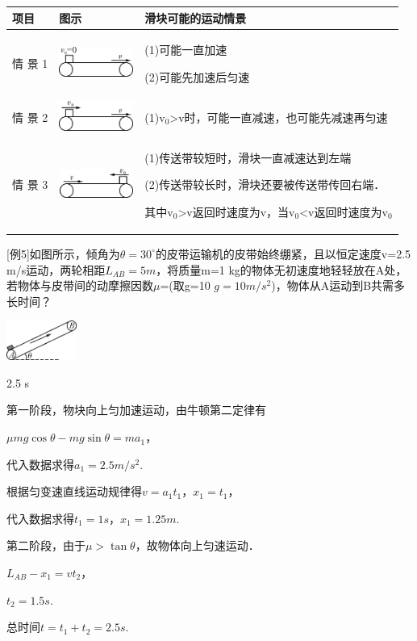 \documentclass[cn,10.5pt,chinese,mac,chinesefont=founder]{elegantbook}
\begin{document}
\begin{longtable}[]{@{}m{1cm}m{2.5cm}m{10cm}@{}}
\toprule
项目 & 图示 & 滑块可能的运动情景\tabularnewline
\midrule
\endhead

情
景
1
&
\includegraphics[width=0.95833in,height=0.38542in]{media/image123.png}& 
(1)可能一直加速

(2)可能先加速后匀速\tabularnewline
情
景
2
&
\includegraphics[width=0.95833in,height=0.38542in]{media/image124.png}
 &
(1)$\mathrm v_0$\textgreater v时，可能一直减速，也可能先减速再匀速\tabularnewline

情
景
3
& 
\includegraphics[width=0.95833in,height=0.375in]{media/image125.png}
& 
(1)传送带较短时，滑块一直减速达到左端

(2)传送带较长时，滑块还要被传送带传回右端．

其中$\mathrm v_0$\textgreater v返回时速度为v，当$\mathrm v_0$\textless v返回时速度为$\mathrm v_0$\strut
\tabularnewline
\bottomrule
\end{longtable}
\newpage
{[}例5{]}如图所示，倾角为$\theta=30^\circ$的皮带运输机的皮带始终绷紧，且以恒定速度v=2.5
m/s运动，两轮相距$L_{AB}=5 m$，将质量m=1
kg的物体无初速度地轻轻放在A处，若物体与皮带间的动摩擦因数$\mu$=(取g=10
$g=10m/s^2$)，物体从A运动到B共需多长时间？

\begin{center}\includegraphics[width=0.90625in,height=0.51042in]{media/image126.png}\end{center}
\begin{solution}
2.5 s

	第一阶段，物块向上匀加速运动，由牛顿第二定律有

$\mu mg\cos \theta-mg\sin \theta=ma_1$，

代入数据求得$a_1=2.5 m/s^2$.

根据匀变速直线运动规律得$v=a_1t_1$，$x_1=t_1$，

代入数据求得$t_1=1 s$，$x_1=1.25 m$.

第二阶段，由于$\mu>\tan \theta$，故物体向上匀速运动．

$L_{AB}-x_1=vt_2$，

$t_2=1.5 s$.

总时间$t=t_1+t_2=2.5 s$.


\end{solution}
\end{document}
